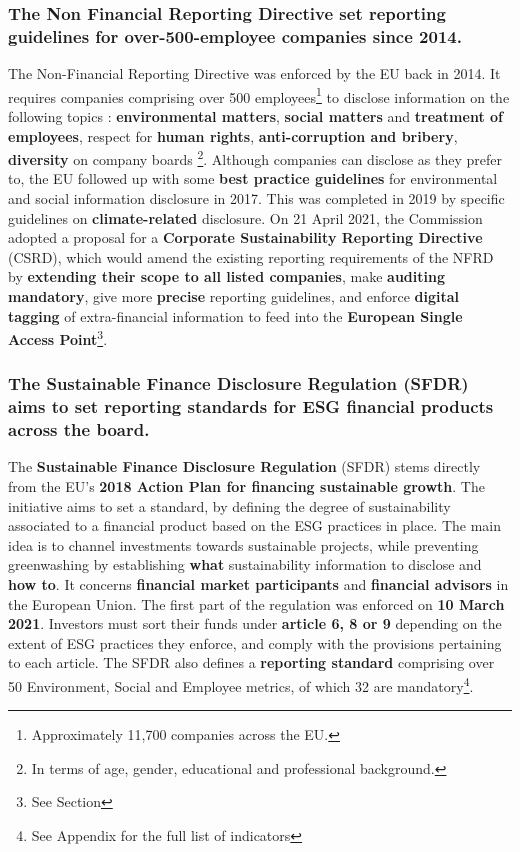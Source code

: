 \documentclass[12pt]{report}
\begin{document}
\subsubsection{The Non Financial Reporting Directive set reporting guidelines for over-500-employee companies since 2014.}
The Non-Financial Reporting Directive was enforced by the EU back in 2014. It requires companies comprising over 500 employees\footnote{Approximately 11,700 companies across the EU.} to disclose information on the following topics : \textbf{environmental matters}, \textbf{social matters} and \textbf{treatment of employees}, respect for \textbf{human rights}, \textbf{anti-corruption and bribery}, \textbf{diversity} on company boards \footnote{In terms of age, gender, educational and professional background.}. 
Although companies can disclose as they prefer to, the EU followed up with some \textbf{best practice guidelines} for environmental and social information disclosure in 2017. This was completed in 2019 by specific guidelines on \textbf{climate-related} disclosure. 
On 21 April 2021, the Commission adopted a proposal for a \textbf{Corporate Sustainability Reporting Directive} (CSRD), which would amend the existing reporting requirements of the NFRD by \textbf{extending their scope to all listed companies}, make \textbf{auditing mandatory}, give more \textbf{precise} reporting guidelines, and enforce \textbf{digital tagging} of extra-financial information to feed into the \textbf{European Single Access Point}\footnote{See Section }. 

\subsubsection{The Sustainable Finance Disclosure Regulation (SFDR) aims to set reporting standards for ESG financial products across the board.}

The \textbf{Sustainable Finance Disclosure Regulation} (SFDR) stems directly from the EU’s \textbf{2018 Action Plan for financing sustainable growth}. The initiative aims to set a standard, by defining the degree of sustainability associated to a financial product based on the ESG practices in place. The main idea is to channel investments towards sustainable projects, while preventing greenwashing by establishing \textbf{what} sustainability information to disclose and \textbf{how to}. It concerns \textbf{financial market participants} and \textbf{financial advisors} in the European Union. The first part of the regulation was enforced on \textbf{10 March 2021}. Investors must sort their funds under \textbf{article 6, 8 or 9} depending on the extent of ESG practices they enforce, and comply with the provisions pertaining to each article. The SFDR also defines a \textbf{reporting standard} comprising over 50 Environment, Social and Employee metrics, of which 32 are mandatory\footnote{See Appendix for the full list of indicators}. 
\end{document}
